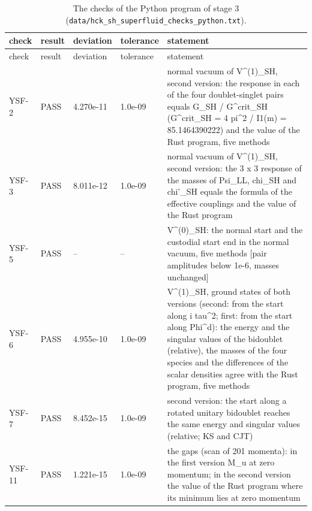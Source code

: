\documentclass[aps,prd,onecolumn,superscriptaddress,nofootinbib,floatfix,longbibliography]{revtex4-2}
\begin{document}
\begingroup\fontsize{7}{8.5}\selectfont\setlength{\tabcolsep}{3pt}
\begin{longtable}{p{}p{}p{}p{}p{}}
\caption{\label{tab:checks_superfluid_python}The checks of the Python program of stage 3 (\texttt{data/hck\_sh\_superfluid\_checks\_python.txt}).}\\
\hline\hline
check & result & deviation & tolerance & statement \\ \hline
\endfirsthead
\hline check & result & deviation & tolerance & statement \\ \hline
\endhead
\hline\hline
\endlastfoot
YSF-2 & PASS & 4.270e-11 & 1.0e-09 & normal vacuum of V\textasciicircum{}(1)\_SH, second version: the response in each of the four doublet-singlet pairs equals G\_SH / G\textasciicircum{}crit\_SH (G\textasciicircum{}crit\_SH = 4 pi\textasciicircum{}2 / I1(m) = 85.1464390222) and the value of the Rust program, five methods \\
YSF-3 & PASS & 8.011e-12 & 1.0e-09 & normal vacuum of V\textasciicircum{}(1)\_SH, second version: the 3 x 3 response of the masses of Psi\_LL, chi\_SH and chi'\_SH equals the formula of the effective couplings and the value of the Rust program \\
YSF-5 & PASS & -- & -- & V\textasciicircum{}(0)\_SH: the normal start and the custodial start end in the normal vacuum, five methods [pair amplitudes below 1e-6, masses unchanged] \\
YSF-6 & PASS & 4.955e-10 & 1.0e-09 & V\textasciicircum{}(1)\_SH, ground states of both versions (second: from the start along i tau\textasciicircum{}2; first: from the start along Phi\textasciicircum{}d): the energy and the singular values of the bidoublet (relative), the masses of the four species and the differences of the scalar densities agree with the Rust program, five methods \\
YSF-7 & PASS & 8.452e-15 & 1.0e-09 & second version: the start along a rotated unitary bidoublet reaches the same energy and singular values (relative; KS and CJT) \\
YSF-11 & PASS & 1.221e-15 & 1.0e-09 & the gaps (scan of 201 momenta): in the first version \textbar{}M\_u\textbar{} at zero momentum; in the second version the value of the Rust program where its minimum lies at zero momentum \\

\end{longtable}
\end{document}
